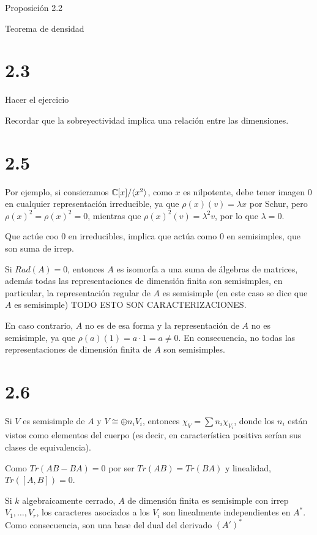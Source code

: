 \documentclass[ANAyTR.tex]{subfiles}
\begin{document}
Proposición 2.2

Teorema de densidad

\section{2.3}

Hacer el ejercicio

Recordar que la sobreyectividad implica una relación entre las dimensiones.


\section{2.5}
Por ejemplo, si consieramos $\mathbb{C}[x]/\langle{x^2}\rangle$, como $x$ es nilpotente, debe tener imagen 0 en cualquier representación irreducible, ya que $\rho(x)(v)=\lambda x$ por Schur, pero $\rho(x)^2=\rho(x)^2=0$, mientras que $\rho(x)^2(v)=\lambda^2 v$, por lo que $\lambda=0$. 

Que actúe coo 0 en irreducibles, implica que actúa como 0 en semisimples, que son suma de irrep.

Si $Rad(A)=0$, entonces $A$ es isomorfa a una suma de álgebras de matrices, además todas las representaciones de dimensión finita son semisimples, en particular, la representación regular de $A$ es semisimple (en este caso se dice que $A$ es semisimple) TODO ESTO SON CARACTERIZACIONES.

 En caso contrario, $A$ no es de esa forma y la representación de $A$ no es semisimple, ya que $\rho(a)(1)=a\cdot 1=a\neq 0$. En consecuencia, no todas las representaciones de dimensión finita de $A$ son semisimples.
 
 \section{2.6}
 
 Si $V$ es semisimple de $A$ y $V\cong\oplus n_i V_i$, entonces $\chi_V=\sum n_i\chi_{V_i}$, donde los $n_i$ están vistos como elementos del cuerpo (es decir, en característica positiva serían sus clases de equivalencia). 
 
 
 Como $Tr(AB-BA)=0$ por ser $Tr(AB)=Tr(BA)$ y linealidad, $Tr([A,B])=0$. 
 
 Si $k$ algebraicamente cerrado, $A$ de dimensión finita es semisimple con irrep $V_1,\dots, V_r$, los caracteres asociados a los $V_i$ son linealmente independientes en $A^*$. Como consecuencia, son una base del dual del derivado $(A')^*$
 
\end{document}
